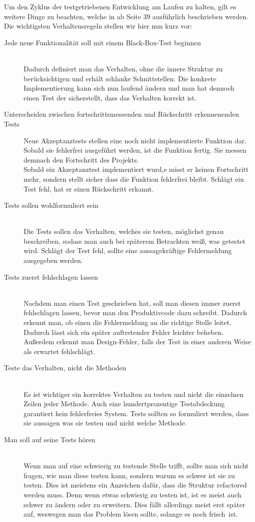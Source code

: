 Um den Zyklus der testgetriebenen Entwicklung am Laufen zu halten, gilt es weitere Dinge zu beachten, welche in \cite{FRE10} ab Seite 39 ausführlich beschrieben werden. Die wichtigsten Verhaltensregeln stellen wir hier nun kurz vor:

\begin{description}
\item[\small Jede neue Funktionalität soll mit einem Black-Box-Test beginnen]~\\
	Dadurch definiert man das Verhalten, ohne die innere Struktur zu berücksichtigen und erhält schlanke Schnittstellen. Die konkrete Implementierung kann sich nun laufend ändern und man hat dennoch einen Test der sicherstellt, dass das Verhalten korrekt ist.
\item[\small Unterscheiden zwischen fortschrittsmessenden und Rückschritt erkennenenden Tests]
	Neue Akzeptanztests stellen eine noch nicht implementierte Funktion dar. Sobald sie fehlerfrei ausgeführt werden, ist die Funktion fertig. Sie messen demnach den Fortschritt des Projekts.\\
	Sobald ein Akzeptanztest implementiert wurd,e misst er keinen Fortschritt mehr, sondern stellt sicher dass die Funktion fehlerfrei bleibt. Schlägt ein Test fehl, hat er einen Rückschritt erkannt.
\item[\small Tests sollen wohlformuliert sein]~\\
	Die Tests sollen das Verhalten, welches sie testen, möglichst genau beschreiben, sodass man auch bei späterem Betrachten weiß, was getestet wird. Schlägt der Test fehl, sollte eine aussagekräftige Fehlermeldung ausgegeben werden.
\item[\small Tests zuerst fehlschlagen lassen]~\\
	Nachdem man einen Test geschrieben hat, soll man diesen immer zuerst fehlschlagen lassen, bevor man den Produktivcode dazu schreibt. Dadurch erkennt man, ob einen die Fehlermeldung an die richtige Stelle leitet. Dadurch lässt sich ein später auftretender Fehler leichter beheben. Außerdem erkennt man Design-Fehler, falls der Test in einer anderen Weise als erwartet fehlschlägt.
\item[\small Teste das Verhalten, nicht die Methoden]~\\
	Es ist wichtiger ein korrektes Verhalten zu testen und nicht die einzelnen Zeilen jeder Methode. Auch eine hundertprozentige Testabdeckung garantiert kein fehlerfreies System. Tests sollten so formuliert werden, dass sie aussagen was sie testen und nicht welche Methode.
\item[\small Man soll auf seine Tests hören]~\\
	Wenn man auf eine schwierig zu testende Stelle trifft, sollte man sich nicht fragen, wie man diese testen kann, sondern warum es schwer ist sie zu testen. Dies ist meistens ein Anzeichen dafür, dass die Struktur refactored werden muss. Denn wenn etwas schwierig zu testen ist, ist es meist auch schwer zu ändern oder zu erweitern. Dies fällt allerdings meist erst später auf, weswegen man das Problem lösen sollte, solange es noch \grqq frisch\grqq~ist.
\end{description}

